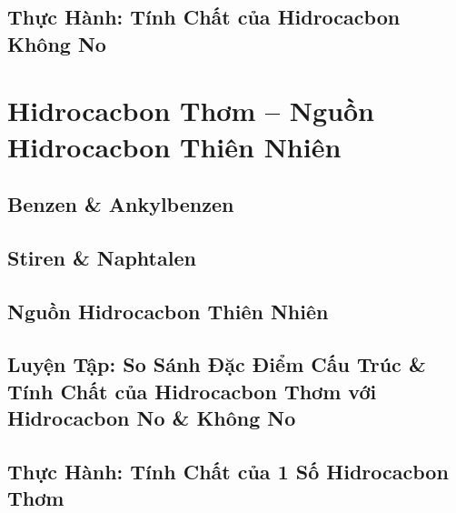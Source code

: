 \documentclass[oneside]{book}
\numberwithin{equation}{section}
\begin{document}

\section{Thực Hành: Tính Chất của Hidrocacbon Không No}


\chapter{Hidrocacbon Thơm -- Nguồn Hidrocacbon Thiên Nhiên}

\section{Benzen \& Ankylbenzen}


\section{Stiren \& Naphtalen}


\section{Nguồn Hidrocacbon Thiên Nhiên}


\section{Luyện Tập: So Sánh Đặc Điểm Cấu Trúc \& Tính Chất của Hidrocacbon Thơm với Hidrocacbon No \& Không No}


\section{Thực Hành: Tính Chất của 1 Số Hidrocacbon Thơm}

\end{document}
